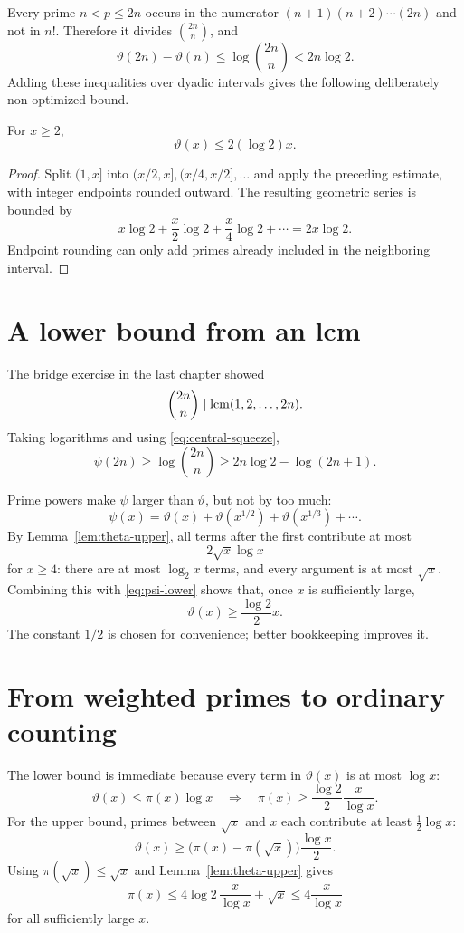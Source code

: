 Every prime $n<p\le2n$ occurs in the numerator $(n+1)(n+2)\cdots(2n)$ and not in $n!$. Therefore it divides $\binom{2n}{n}$, and
\[
\vartheta(2n)-\vartheta(n)
\le\log\binom{2n}{n}
<2n\log2.
\]
Adding these inequalities over dyadic intervals gives the following deliberately non-optimized bound.

\begin{lemma}\label{lem:theta-upper}
For $x\ge2$,
\[
\vartheta(x)\le 2(\log2)x.
\]
\end{lemma}

\begin{proof}
Split $(1,x]$ into $(x/2,x],(x/4,x/2],\dots$ and apply the preceding estimate, with integer endpoints rounded outward. The resulting geometric series is bounded by
\[
x\log2+\frac{x}{2}\log2+\frac{x}{4}\log2+\cdots=2x\log2.
\]
Endpoint rounding can only add primes already included in the neighboring interval.
\end{proof}

\section{A lower bound from an lcm}

The bridge exercise in the last chapter showed
\[
\binom{2n}{n}\mid\operatorname{lcm}(1,2,\dots,2n).
\]
Taking logarithms and using \eqref{eq:central-squeeze},
\begin{equation}\label{eq:psi-lower}
\psi(2n)\ge\log\binom{2n}{n}\ge2n\log2-\log(2n+1).
\end{equation}

Prime powers make $\psi$ larger than $\vartheta$, but not by too much:
\[
\psi(x)=\vartheta(x)+\vartheta(x^{1/2})+\vartheta(x^{1/3})+\cdots.
\]
By Lemma~\ref{lem:theta-upper}, all terms after the first contribute at most
\[
2\sqrt{x}\log x
\]
for $x\ge4$: there are at most $\log_2x$ terms, and every argument is at most $\sqrt x$. Combining this with \eqref{eq:psi-lower} shows that, once $x$ is sufficiently large,
\begin{equation}\label{eq:theta-lower}
\vartheta(x)\ge \frac{\log2}{2}x.
\end{equation}
The constant $1/2$ is chosen for convenience; better bookkeeping improves it.

\section{From weighted primes to ordinary counting}

The lower bound is immediate because every term in $\vartheta(x)$ is at most $\log x$:
\[
\vartheta(x)\le\pi(x)\log x
\quad\Longrightarrow\quad
\pi(x)\ge\frac{\log2}{2}\frac{x}{\log x}.
\]
For the upper bound, primes between $\sqrt x$ and $x$ each contribute at least $\tfrac12\log x$:
\[
\vartheta(x)\ge\bigl(\pi(x)-\pi(\sqrt x)\bigr)\frac{\log x}{2}.
\]
Using $\pi(\sqrt x)\le\sqrt x$ and Lemma~\ref{lem:theta-upper} gives
\[
\pi(x)\le4\log2\,\frac{x}{\log x}+\sqrt x
\le4\frac{x}{\log x}
\]
for all sufficiently large $x$.

